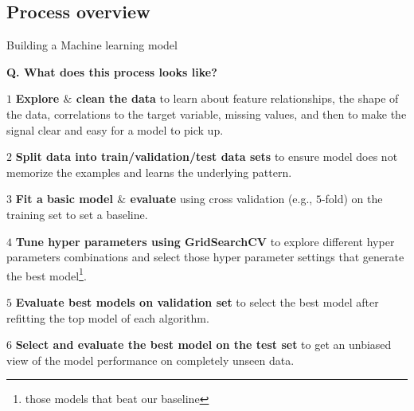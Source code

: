 \subsection{Process overview}
\begin{transitionsubframe}
  \begin{center}
    \Huge Building a Machine learning model
  \end{center}
\end{transitionsubframe}

\begin{frame}[fragile]{\textbf{Q. What does this process looks like?}}
  \begin{wideitemize}
  \item[$1$] \textbf{Explore $\&$ clean the data} {\footnotesize to
      learn about feature relationships, the shape of the data, correlations to
      the target variable, missing values, and then to make the signal
      clear and easy for a model to pick up.}\vspace{-.5em}
    \item[$2$] \textbf{Split data into train/validation/test data sets}
      {\footnotesize to ensure model does not memorize the examples and learns
        the underlying pattern}.\vspace{-.5em}
    \item[$3$] \textbf{Fit a basic model $\&$ evaluate} {\footnotesize using cross
        validation (e.g., $5$-fold) on the training set to set a baseline.}\vspace{-.5em}
    \item[$4$] \textbf{Tune hyper parameters using GridSearchCV} {\footnotesize
        to explore different hyper parameters combinations and select those
        hyper parameter settings that generate the best model\footnote{those
          models that beat our baseline}}.\vspace{-.5em}
    \item[$5$] \textbf{Evaluate best models on validation set} {\footnotesize to select the
        best model after refitting the top model of each algorithm.}\vspace{-.5em}
    \item[$6$] \textbf{Select and evaluate the best model on the test set}
      {\footnotesize to get an unbiased view of the model performance on
        completely unseen data.}\vspace{-.5em}
  \end{wideitemize}
\end{frame}


